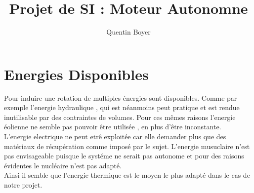 \documentclass[a4paper,12pt]{article}
\title{Projet de SI : Moteur Autonomne}
\author{Quentin Boyer}
\begin{document}
\maketitle
\tableofcontents

\section{Energies Disponibles}

\indent  Pour induire une rotation de multiples énergies sont disponibles. Comme par exemple l'energie hydraulique , qui est néanmoins peut pratique et est rendue inutilisable par des contraintes de volumes. Pour ces mêmes raisons l'energie éolienne ne semble pas pouvoir être utilisée , en plus d'être inconstante.\\[0.3cm]
\indent  L'energie electrique ne peut etrê exploitée car elle demander plus que des matériaux de récupération comme imposé par le sujet. L'energie musuclaire n'est pas envisageable puisque le systéme ne serait pas autonome et pour des raisons évidentes le nucléaire n'est pas adapté.\\[0.3cm]
\indent  Ainsi il semble que l'energie thermique est le moyen le plus adapté dans le cas de notre projet.\\[0.05cm]
\end{document}
